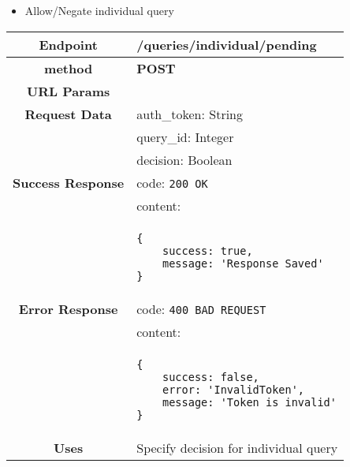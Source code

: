     \begin{itemize}
        \item Allow/Negate individual query
    \end{itemize}
    \begin{adjustwidth}{1cm}{}
        \begin{longtable}{|c|l|}
            \hline
            \textbf{Endpoint} & /queries/individual/pending \\
            \hline
            \textbf{method} & \textbf{POST} \\
            \hline
            \textbf{URL Params} &  \\
            \hline
            \textbf{Request Data} &  auth\_token: String \\
            & query\_id: Integer \\
            & decision: Boolean \\
            \hline
            \textbf{Success Response} & code: \texttt{200 OK} \\
            &                           content: \\
            & \begin{minipage}[t]{0.5\textwidth}
                \begin{adjustwidth}{1.5cm}{}
                \begin{verbatim}
{
    success: true, 
    message: 'Response Saved'
}
                \end{verbatim}
                \end{adjustwidth}
              \end{minipage} \\
              \hline
            \textbf{Error Response} & code: \texttt{400 BAD REQUEST} \\
              &                     content: \\
              & \begin{minipage}[t]{0.7\textwidth}
                \begin{adjustwidth}{1.5cm}{}
                \begin{verbatim}
{
    success: false, 
    error: 'InvalidToken',
    message: 'Token is invalid'
}
                \end{verbatim}
                \end{adjustwidth}
                 \vspace{4pt}
              \end{minipage} \\
              \hline
            \textbf{Uses} & Specify decision for individual query \\
            \hline
            

\end{longtable}
\end{adjustwidth}
